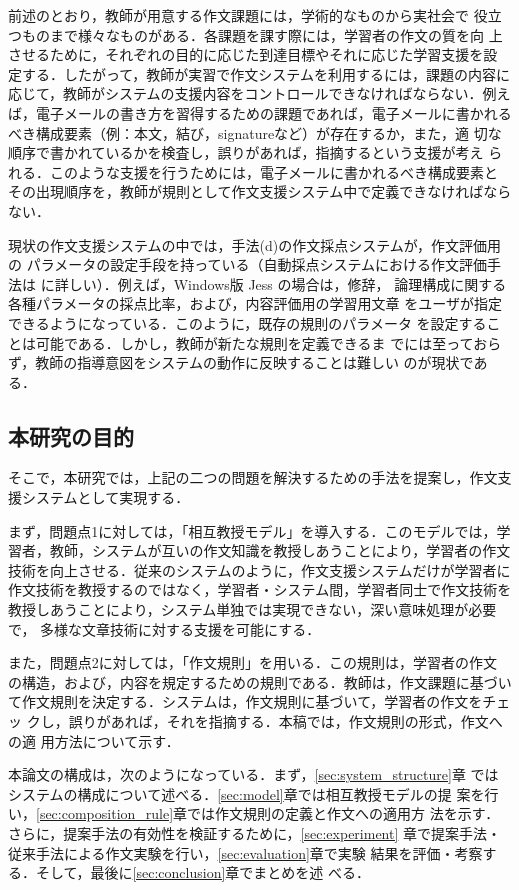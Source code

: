 \documentclass[japanese]{jnlp_1.4}
\newcommand{\subsubsectionX}[1]{}
\def\modk{}
\begin{document}
{\subsubsectionX{問題点2: 教師の指導意図をシステムの動作に十分反映できないこと}
{\modk 前述のとおり，教師が用意する作文課題には，学術的なものから実社会で
役立つものまで様々なものがある．各課題を課す際には，学習者の作文の質を向
上させるために，それぞれの目的に応じた到達目標やそれに応じた学習支援を設
定する．したがって，}教師が実習で作文システムを利用するには，課題の内容に
応じて，教師がシステムの支援内容をコントロールできなければならない．例え
ば，電子メールの書き方を習得するための課題であれば，電子メールに書かれる
べき構成要素（例：本文，結び，signatureなど）が{\modk 存在するか，また，}適
切な順序で書かれているかを検査し，誤りがあれば，指摘するという支援が考え
られる．このような支援を行うためには，電子メールに書かれるべき構成要素と
その出現順序を，教師が規則として作文支援システム中で定義できなければなら
ない．

現状の作文支援システムの中では，手法(d)の作文採点システムが，作文評価用の
パラメータの設定手段を持っている（自動採点システムにおける作文評価手法は
\cite{石岡恒憲:20040910}に詳しい）．例えば，Windows版 Jess の場合は，修辞，
論理構成に関する各種パラメータの採点比率，および，内容評価用の学習用文章
をユーザが指定できるようになっている．このように，既存の規則のパラメータ
を設定することは可能である．{\modk しかし，教師が新たな規則を定義できるま
でには至っておらず，教師の指導意図をシステムの動作に反映することは難しい
のが現状である．}


\subsection{本研究の目的}

そこで，本研究では，上記の二つの問題を解決するための手法を提案し，作文支
援システムとして実現する．

まず，問題点1に対しては，「相互教授モデル」を導入する．このモデルでは，学
習者，教師，システムが互いの作文知識を教授しあうことにより，学習者の作文
技術を向上させる．従来のシステムのように，作文支援システムだけが学習者に
作文技術を教授するのではなく，学習者・システム間，学習者同士で作文技術を
教授しあうことにより，システム単独では実現できない，深い意味処理が必要で，
多様な文章技術に対する支援を可能にする．

また，問題点2に対しては，「作文規則」を用いる．この規則は，学習者の作文
の構造，および，内容を規定するための規則である．教師は，作文課題に基づい
て作文規則を決定する．システムは，作文規則に基づいて，学習者の作文をチェッ
クし，誤りがあれば，それを指摘する．本稿では，作文規則の形式，作文への適
用方法について示す．


本論文の構成は，次のようになっている．まず，\ref{sec:system_structure}章
ではシステムの構成について述べる．\ref{sec:model}章では相互教授モデルの提
案を行い，\ref{sec:composition_rule}章では作文規則の定義と作文への適用方
法を示す．さらに，提案手法の有効性を検証するために，\ref{sec:experiment}
章で提案手法・従来手法による作文実験を行い，\ref{sec:evaluation}章で実験
結果を評価・考察する．そして，最後に\ref{sec:conclusion}章でまとめを述
べる．}
\end{document}
